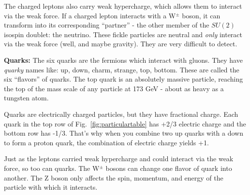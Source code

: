 The charged leptons also carry weak hypercharge, which allows them to interact via the weak force. 
If a charged lepton interacts with a W$^\pm$ boson, it can transform into its corresponding ``partner'' - the other member of the $SU(2)$ isospin doublet: the neutrino.
These fickle particles are neutral and \emph{only} interact via the weak force (well, and maybe gravity). 
They are very difficult to detect.




{\bf Quarks:}
The six quarks are the fermions which interact with gluons.
They have \emph{quarky} names like: 
up, down, charm, strange, top, bottom. 
These are called the six ``flavors'' of quarks.
The top quark is an absolutely massive particle, reaching the top of the mass scale of any particle at 173 GeV - about as heavy as a tungsten atom.

Quarks are electrically charged particles, but they have fractional charge.
Each quark in the top row of Fig.~\ref{fig:particulartable} has +2/3 electric charge and the bottom row has -1/3.
That's why when you combine two up quarks with a down to form a proton quark, the combination of electric charge yields +1.

Just as the leptons carried weak hypercharge and could interact via the weak force, so too can quarks. 
The W$^{\pm}$ bosons can change one flavor of quark into another.
The Z boson only affects the spin, momentum, and energy of the particle with which it interacts.

